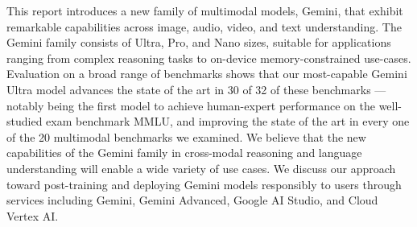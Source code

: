 This report introduces a new family of multimodal models, Gemini, that exhibit remarkable capabilities across image, audio, video, and text understanding. The Gemini family consists of Ultra, Pro, and Nano sizes, suitable for applications ranging from complex reasoning tasks to on-device memory-constrained use-cases. Evaluation on a broad range of benchmarks shows that our most-capable Gemini Ultra model advances the state of the art in 30 of 32 of these benchmarks --- notably being the first model to achieve human-expert performance on the well-studied exam benchmark MMLU, and improving the state of the art in every one of the 20 multimodal benchmarks we examined. We believe that the new capabilities of the Gemini family in cross-modal reasoning and language understanding will enable a wide variety of use cases. We discuss our approach toward post-training and deploying Gemini models responsibly to users through services including Gemini, Gemini Advanced, Google AI Studio, and Cloud Vertex AI.